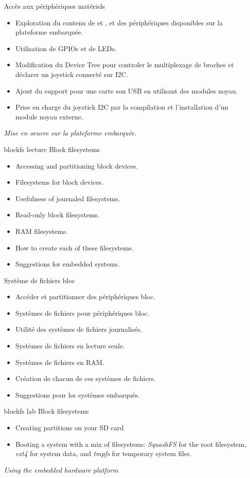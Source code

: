 {Accès aux périphériques matériels}
{
  \begin{itemize}
  \item Exploration du contenu de  et , et des
    périphériques disponibles sur la plateforme embarquée.
  \item Utilisation de GPIOs et de LEDs.
  \item Modification du Device Tree pour controler le multiplexage
    de broches et déclarer un joystick connecté sur I2C.
  \item Ajout du support pour une carte son USB en utilisant des
    modules noyau.
  \item Prise en charge du joystick I2C par la compilation et
    l'installation d'un module noyau externe.
  \end{itemize}

  \vspace{0.5cm}
  {\em Mise en oeuvre sur la plateforme embarquée.}
}
{blockfs}
{lecture}
{Block filesystems}
{
  \begin{itemize}
  \item Accessing and partitioning block devices.
  \item Filesystems for block devices.
  \item Usefulness of journaled filesystems.
  \item Read-only block filesystems.
  \item RAM filesystems.
  \item How to create each of these filesystems.
  \item Suggestions for embedded systems.
  \end{itemize}
}
{Système de fichiers bloc}
{
  \begin{itemize}
  \item Accéder et partitionner des périphériques bloc.
  \item Systèmes de fichiers pour périphériques bloc.
  \item Utilité des systèmes de fichiers journalisés.
  \item Systèmes de fichiers en lecture seule.
  \item Systèmes de fichiers en RAM.
  \item Création de chacun de ces systèmes de fichiers.
  \item Suggestions pour les systèmes embarqués.
  \end{itemize}
}
{blockfs}
{lab}
{Block filesystems}
{
  \begin{itemize}
  \item Creating partitions on your SD card
  \item Booting a system with a mix of filesystems: {\em SquashFS} for
    the root filesystem, {\em ext4} for system data, and {\em
      tmpfs} for temporary system files.
  \end{itemize}

  \vspace{0.5cm}
  {\em Using the embedded hardware platform}
}
